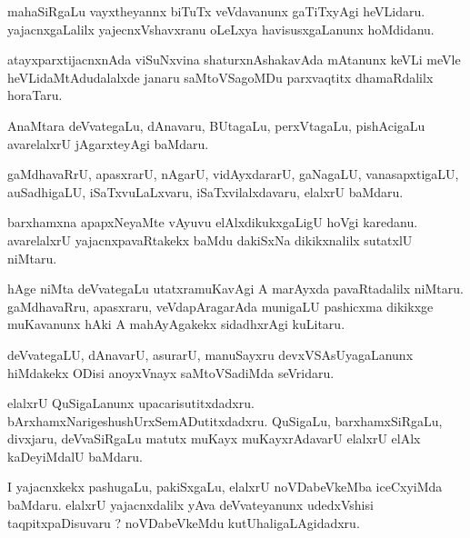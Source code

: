\documentclass{article}
\begin{document}
\begin{mn}
mahaSiRgaLu vayxtheyannx biTuTx veVdavanunx gaTiTxyAgi heVLidaru.  yajacnxgaLalilx  
yajecnxVshavxranu oLeLxya havisusxgaLanunx  hoMdidanu.
\end{mn}

\begin{mn}
atayxparxtijacnxnAda viSuNxvina  shaturxnAshakavAda mAtanunx  keVLi meVle  
heVLidaMtAdudalalxde  janaru  saMtoVSagoMDu  parxvaqtitx  dhamaRdalilx horaTaru.
\end{mn}

\begin{mn}
AnaMtara deVvategaLu, dAnavaru, BUtagaLu, perxVtagaLu, pishAcigaLu avarelalxrU  jAgarxteyAgi baMdaru.
\end{mn}

\begin{mn}
gaMdhavaRrU, apasxrarU,  nAgarU, vidAyxdararU,  gaNagaLU,  vanasapxtigaLU, auSadhigaLU, 
iSaTxvuLaLxvaru, iSaTxvilalxdavaru,  elalxrU  baMdaru.
\end{mn}

\begin{mn}
barxhamxna apapxNeyaMte   vAyuvu  elAlxdikukxgaLigU hoVgi karedanu.  avarelalxrU 
yajacnxpavaRtakekx baMdu  dakiSxNa dikikxnalilx  sutatxlU niMtaru.
\end{mn}

\begin{mn}
hAge niMta deVvategaLu utatxramuKavAgi  A  marAyxda pavaRtadalilx niMtaru.  
gaMdhavaRru,  apasxraru,  veVdapAragarAda munigaLU pashicxma dikikxge  
muKavanunx hAki  A mahAyAgakekx  sidadhxrAgi  kuLitaru.
\end{mn}

\begin{mn}
deVvategaLU, dAnavarU, asurarU, manuSayxru devxVSAsUyagaLanunx hiMdakekx  
ODisi  anoyxVnayx saMtoVSadiMda seVridaru.
\end{mn}

\begin{mn}
elalxrU QuSigaLanunx  upacarisutitxdadxru.  bArxhamxNarigeshushUrxSemADutitxdadxru.  QuSigaLu,  
barxhamxSiRgaLu,  divxjaru, deVvaSiRgaLu  matutx muKayx muKayxrAdavarU  elalxrU elAlx kaDeyiMdalU  baMdaru.
\end{mn}

\begin{mn}
I yajacnxkekx pashugaLu, pakiSxgaLu, elalxrU  noVDabeVkeMba  iceCxyiMda baMdaru.  
elalxrU  yajacnxdalilx  yAva deVvateyanunx  udedxVshisi  taqpitxpaDisuvaru ?   
noVDabeVkeMdu  kutUhaligaLAgidadxru.
\end{mn}
\end{document}
